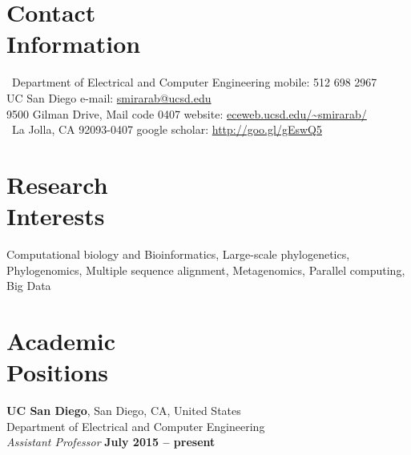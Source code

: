 \documentclass[margin,line,letterpaper]{resume}
\begin{document}
\begin{resume}

    \section{\mysidestyle Contact\\Information}
    ~Department of Electrical and Computer Engineering 				\hfill mobile: 512 698 2967   \vspace{0mm}\\\vspace{0mm} 
    \vspace{0mm} UC San Diego   \hfill  e-mail: \url{smirarab@ucsd.edu}   \vspace{0mm}\\\vspace{0mm}
   9500 Gilman Drive, Mail code 0407  \hfill website: \url{eceweb.ucsd.edu/~smirarab/} \vspace{0mm}\\\vspace{-4.5mm}%
   ~La Jolla, CA 92093-0407   	\hfill google scholar: \url{http://goo.gl/gEswQ5} \vspace{0mm}\\\vspace{-4.5mm}
    \section{\mysidestyle Research\\Interests}

      Computational biology and Bioinformatics, Large-scale phylogenetics, Phylogenomics, Multiple sequence alignment,  Metagenomics, Parallel computing, Big Data
      
    \section{\mysidestyle Academic\\Positions}

    \textbf{UC San Diego}, San Diego, CA, United States\\
    Department of Electrical and Computer Engineering\vspace{2mm}\\\vspace{1mm}%
    \textsl{Assistant Professor} \hfill \textbf{ July 2015 -- present}\vspace{-3mm}\\\vspace{-1mm}%

\end{resume}
\end{document}
